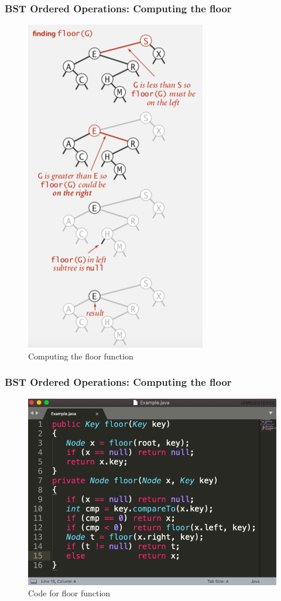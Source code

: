 \documentclass[11pt]{beamer}
\begin{document}
    \begin{frame}[fragile]
   	\frametitle{BST Ordered Operations:  Computing the floor}
     \begin{figure}
     	\centering
     	\includegraphics[width=0.34\linewidth]{"Screenshot 2020-11-03 at 11.18.17 PM"}
     	\caption{Computing the floor function}
     	\label{fig:screenshot-2020-11-03-at-11}
     \end{figure}
     
   \end{frame}

   \begin{frame}[fragile]
   	\frametitle{BST Ordered Operations:  Computing the floor}
   	\begin{figure}
   		\centering
   		\includegraphics[width=0.8\linewidth]{"Screenshot 2020-11-03 at 11.23.07 PM"}
   		\caption{Code for floor function}
   		\label{fig:screenshot-2020-11-03-at-11}
   	\end{figure}	
   \end{frame}
\end{document}
